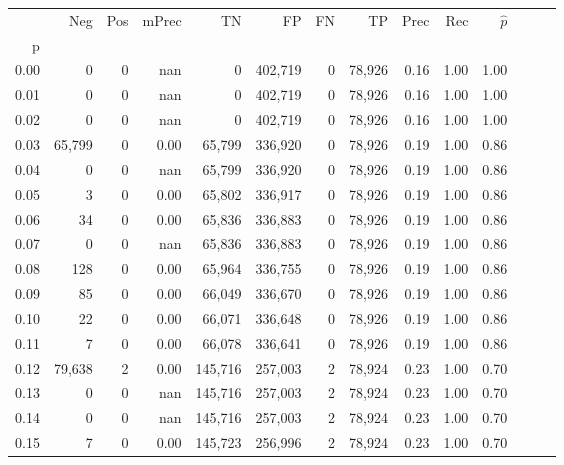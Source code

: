 \begin{tabular}{rrrrrrrrrrrrrr}
\toprule
{} &     Neg &     Pos & mPrec &       TN &       FP &      FN &      TP &  Prec &   Rec & $\hat{p}$ \\
p    &         &         &       &          &          &         &         &       &       &           \\
\midrule
0.00 &       0 &       0 &   nan &        0 &  402,719 &       0 &  78,926 &  0.16 &  1.00 &      1.00 \\
0.01 &       0 &       0 &   nan &        0 &  402,719 &       0 &  78,926 &  0.16 &  1.00 &      1.00 \\
0.02 &       0 &       0 &   nan &        0 &  402,719 &       0 &  78,926 &  0.16 &  1.00 &      1.00 \\
0.03 &  65,799 &       0 &  0.00 &   65,799 &  336,920 &       0 &  78,926 &  0.19 &  1.00 &      0.86 \\
0.04 &       0 &       0 &   nan &   65,799 &  336,920 &       0 &  78,926 &  0.19 &  1.00 &      0.86 \\
0.05 &       3 &       0 &  0.00 &   65,802 &  336,917 &       0 &  78,926 &  0.19 &  1.00 &      0.86 \\
0.06 &      34 &       0 &  0.00 &   65,836 &  336,883 &       0 &  78,926 &  0.19 &  1.00 &      0.86 \\
0.07 &       0 &       0 &   nan &   65,836 &  336,883 &       0 &  78,926 &  0.19 &  1.00 &      0.86 \\
0.08 &     128 &       0 &  0.00 &   65,964 &  336,755 &       0 &  78,926 &  0.19 &  1.00 &      0.86 \\
0.09 &      85 &       0 &  0.00 &   66,049 &  336,670 &       0 &  78,926 &  0.19 &  1.00 &      0.86 \\
0.10 &      22 &       0 &  0.00 &   66,071 &  336,648 &       0 &  78,926 &  0.19 &  1.00 &      0.86 \\
0.11 &       7 &       0 &  0.00 &   66,078 &  336,641 &       0 &  78,926 &  0.19 &  1.00 &      0.86 \\
0.12 &  79,638 &       2 &  0.00 &  145,716 &  257,003 &       2 &  78,924 &  0.23 &  1.00 &      0.70 \\
0.13 &       0 &       0 &   nan &  145,716 &  257,003 &       2 &  78,924 &  0.23 &  1.00 &      0.70 \\
0.14 &       0 &       0 &   nan &  145,716 &  257,003 &       2 &  78,924 &  0.23 &  1.00 &      0.70 \\
0.15 &       7 &       0 &  0.00 &  145,723 &  256,996 &       2 &  78,924 &  0.23 &  1.00 &      0.70 \\

\end{tabular}
